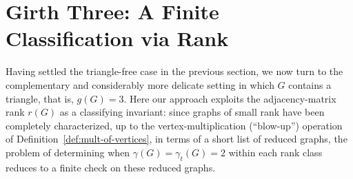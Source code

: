 \documentclass[12pt]{amsart}
\theoremstyle{plain}
\newtheorem{lemma}[theorem]{Lemma}
\theoremstyle{definition}
\begin{document}

\section{Girth Three: A Finite Classification via Rank}

Having settled the triangle-free case in the previous section, we now turn to the complementary and considerably more delicate setting in which $G$ contains a triangle, that is, $g(G)=3$. Here our approach exploits the adjacency-matrix rank $r(G)$ as a classifying invariant: since graphs of small rank have been completely characterized, up to the vertex-multiplication (``blow-up'') operation of Definition~\ref{def:mult-of-vertices}, in terms of a short list of reduced graphs, the problem of determining when $\gamma(G)=\gamma_t(G)=2$ within each rank class reduces to a finite check on these reduced graphs.
\end{document}
